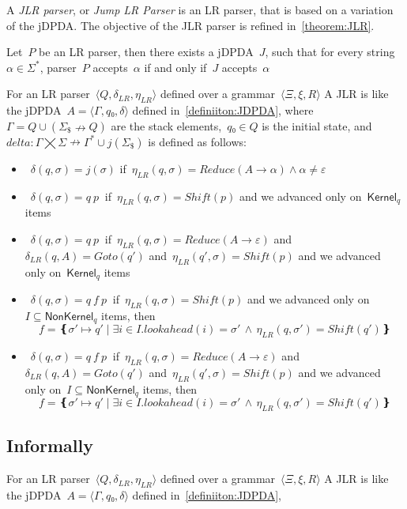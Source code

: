 A \emph{JLR parser}, or \emph{Jump LR Parser} is an LR parser, that
  is based on a variation of the jDPDA\@.
The objective of the JLR parser is refined in~\cref{theorem:JLR}.

\begin{Theorem}
  \label{theorem:JLR}
  Let~$P$ be an LR parser, then there exists a jDPDA~$J$,
  such that for every string~$α∈Σ^*$, parser~$P$ accepts~$α$
    if and only if~$J$ accepts~$α$
\end{Theorem}

For an LR parser~$⟨Q,δ_{LR}, η_{LR}⟩$ defined over a grammar~$⟨Ξ,ξ,R⟩$
A JLR is like the jDPDA~$A=⟨Γ,q₀,δ⟩$ defined in~\cref{definiiton:JDPDA},
  where~$Γ= Q∪(Σ_\$↛Q)$ are the stack elements,~$q₀∈Q$
  is the initial state, and~$delta:Γ⨉Σ↛Γ^*∪j(Σ_\$)$ is defined as follows:
  \begin{itemize}
   \item~$δ(q,σ)= j(σ)$ if~$η_{LR}(q,σ)=Reduce(A→α)∧α≠ε$


   \item~$δ(q,σ)= q \: p~$ if~$η_{LR}(q,σ)=Shift(p)$ and we advanced only on~$\textsf{Kernel}_q$ items
   \item~$δ(q,σ)= q \: p~$ if~$η_{LR}(q,σ)=Reduce(A→ε)$
     and~$δ_{LR}(q,A)=Goto(q')$ and~$η_{LR}(q',σ)=Shift(p)$
     and we advanced only on~$\textsf{Kernel}_q$ items


   \item~$δ(q,σ)= q \: f \: p~$ if~$η_{LR}(q,σ)=Shift(p)$ and we advanced only on~$I⊆\textsf{NonKernel}_q$
     items, then
    \[
      f = ❴σ'↦q' \; | \;∃i∈I. lookahead(i)=σ' \,∧\, η_{LR}(q,σ')=Shift(q')❵
    \]

   \item~$δ(q,σ)= q \: f \: p~$ if~$η_{LR}(q,σ)=Reduce(A→ε)$
     and~$δ_{LR}(q,A)=Goto(q')$ and~$η_{LR}(q',σ)=Shift(p)$
     and we advanced only on~$I⊆\textsf{NonKernel}_q$
     items, then
     \[
      f = ❴σ'↦q' \; | \;∃i∈I. lookahead(i)=σ' \,∧\, η_{LR}(q,σ')=Shift(q')❵
     \]

  \end{itemize}
\subsection{Informally}

For an LR parser~$⟨Q,δ_{LR}, η_{LR}⟩$ defined over a grammar~$⟨Ξ,ξ,R⟩$
A JLR is like the jDPDA~$A=⟨Γ,q₀,δ⟩$ defined in~\cref{definiiton:JDPDA},

